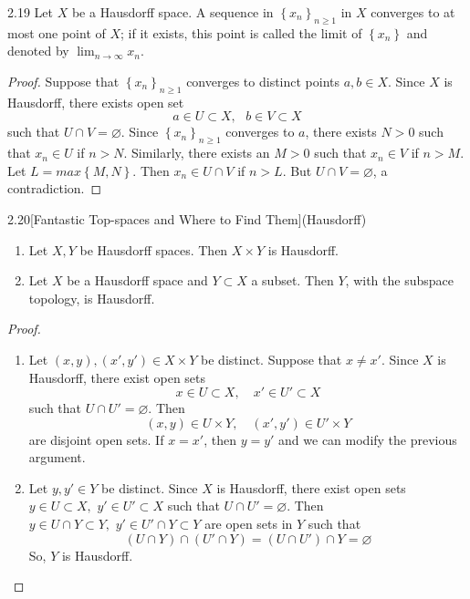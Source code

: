 \begin{customthm}{2.19}
Let $X$ be a Hausdorff space. A sequence in $\left\{x_n\right\}_{n \geqslant 1}$ in $X$ converges to at most one point of $X$; if it exists, this point is called the limit of $\left\{x_n\right\}$ and denoted by $\displaystyle\lim_{n \to \infty} x_n$.
\end{customthm}

\begin{proof}
Suppose that $\left\{x_n\right\}_{n \geqslant 1}$ converges to distinct points $a, b \in X$. Since $X$ is Hausdorff, there exists open set 
$$a \in U \subset X, \,\,\,\, b \in V \subset X$$
such that $U \cap V = \varnothing$. Since $\left\{x_n\right\}_{n \geqslant 1}$ converges to $a$, there exists $N > 0$ such that $x_n \in U$ if $n>N$. Similarly, there exists an $M>0$ such that $x_n \in V$ if $n>M$. Let $L = max\left\{M,N\right\}$. Then $x_n \in U\cap V$ if $n > L$. But $U\cap V = \varnothing$, a contradiction.
\end{proof}

\begin{customthm}{2.20}[Fantastic Top-spaces and Where to Find Them](Hausdorff)
\begin{enumerate}
    \item[1).] Let $X, Y$ be Hausdorff spaces. Then $X \times Y$ is Hausdorff.
    \item[2).] Let $X$ be a Hausdorff space and $Y \subset X$ a subset. Then $Y$, with the subspace topology, is Hausdorff.
\end{enumerate}
\end{customthm}

\begin{proof}
\begin{enumerate}
    \item[1).]Let $(x, y), (x', y') \in X\times Y$ be distinct. Suppose that $x \neq x'$. Since $X$ is Hausdorff, there exist open sets 
    $$x \in U \subset X, \,\,\,\,\,\, x' \in U' \subset X$$
    such that $U\cap U' = \varnothing$. Then 
    $$(x, y) \in U \times Y, \,\,\,\,\,\, (x', y') \in U' \times Y$$
    are disjoint open sets. If $x = x'$, then $y = y'$ and we can modify the previous argument.
    \item[2).]Let $y, y'\in Y$ be distinct. Since $X$ is Hausdorff, there exist open sets $y \in U \subset X, \,\, y' \in U' \subset X$ such that $U\cap U' = \varnothing$. Then $y \in U \cap Y \subset Y,\,\, y' \in U' \cap Y \subset Y$ are open sets in $Y$ such that 
    $$\left(U \cap Y \right) \cap \left(U' \cap Y \right) = \left(U \cap U' \right)\cap Y = \varnothing$$
    So, $Y$ is Hausdorff.
\end{enumerate}
\end{proof}